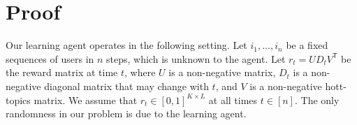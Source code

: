 
\clearpage
\onecolumn
\appendix

\newcommand{\transpose}{^\mathsf{\scriptscriptstyle T}}

\section{Proof}
\label{sec:proof}

Our learning agent operates in the following setting. Let $i_1, \dots, i_n$ be a fixed sequences of users in $n$ steps, which is unknown to the agent. Let $r_t = U D_t V\transpose$ be the reward matrix at time $t$, where $U$ is a non-negative matrix, $D_t$ is a non-negative diagonal matrix that may change with $t$, and $V$ is a non-negative hott-topics matrix. We assume that $r_t \in [0, 1]^{K \times L}$ at all times $t \in [n]$. The only randomness in our problem is due to the learning agent.

